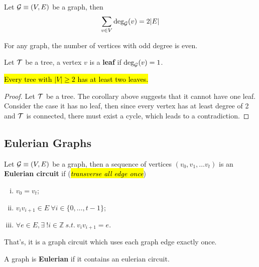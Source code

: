\documentclass{article}
\def\Z{{\mathbb Z}}
\begin{document}
		\begin{theorem}
			Let $\mathcal{{G}} \equiv (V, E)$ be a graph, then
			\begin{equation}
				\sum_{v \in V}\text{{deg}}_{\mathcal{{G}}}(v) = 2 |E|
			\end{equation}
		\end{theorem}
		
		\begin{corollary}
			For any graph, the number of vertices with odd degree is even.
		\end{corollary}
		
		\begin{definition}
			Let $\mathcal{{T}}$ be a tree, a vertex $v$ is a \textbf{leaf} if $\text{{deg}}_{\mathcal{{G}}}(v)=1$.
		\end{definition}
		
		\begin{theorem}
			\hl{Every tree with $|V| \geq 2$ has at least two leaves.}
			\begin{proof}
				Let $\mathcal{{T}}$ be a tree. The corollary above suggests that it cannot have one leaf. Consider the case it has no leaf, then since every vertex has at least degree of 2 and $\mathcal{{T}}$ is connected, there must exist a cycle, which leads to a contradiction.
			\end{proof}
		\end{theorem}
		
		\subsection{Eulerian Graphs}
			\begin{definition}
				Let $\mathcal{{G}} \equiv (V, E)$ be a graph, then a sequence of vertices $(v_0,v_1,\dots v_t)$ is an \textbf{Eulerian circuit} if (\hl{\emph{transverse all edge once}})
				\begin{enumerate}[(i)]
					\item $v_0 = v_t$;
					\item $v_i v_{i+1} \in E\ \forall i \in \{0, \dots, t-1\}$;
					\item $\forall e \in E, \exists\ ! i \in \Z\ s.t.\ v_i v_{i+1} = e$.
				\end{enumerate}
				That's, it is a graph circuit which uses each graph edge exactly once.
			\end{definition}
			
			\begin{definition}
				A graph is \textbf{Eulerian} if it contains an eulerian circuit.
			\end{definition}
			
\end{document}
